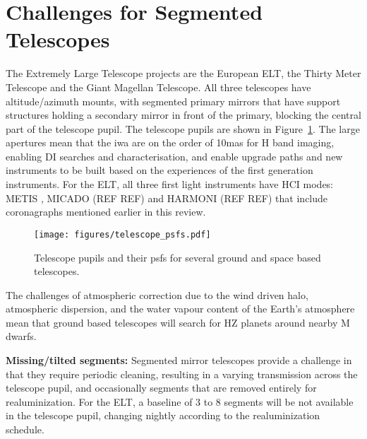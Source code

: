 \documentclass[letterpaper]{ar-1col}
\begin{document}





\section{Challenges for Segmented Telescopes}

The Extremely Large Telescope projects are the European ELT, the Thirty Meter Telescope and the Giant Magellan Telescope.
%
All three telescopes have altitude/azimuth mounts, with segmented primary mirrors that have support structures holding a secondary mirror in front of the primary, blocking the central part of the telescope pupil.
%
The telescope pupils are shown in Figure~\ref{fig:telpsfs}.
%
The large apertures mean that the \ac{iwa} are on the order of 10mas for H band imaging, enabling DI searches and characterisation, and enable upgrade paths and new instruments to be built based on the experiences of the first generation instruments.
%
For the ELT, all three first light instruments have HCI modes: METIS \citep{Brandl21,Kenworthy16,Carlomagno20}, MICADO (REF REF) and HARMONI (REF REF) that include coronagraphs mentioned earlier in this review.
%


\begin{figure}[ht]
  \centering
  \texttt{[image: figures/telescope\_psfs.pdf]}
  \caption{Telescope pupils and their \acp{psf} for several ground and space based telescopes.}
  \label{fig:telpsfs}
\end{figure}

%
The challenges of atmospheric correction due to the wind driven halo, atmospheric dispersion, and the water vapour content of the Earth's atmosphere mean that ground based telescopes will search for HZ planets around nearby M dwarfs.

{\bf Missing/tilted segments:} Segmented mirror telescopes provide a challenge in that they require periodic cleaning, resulting in a varying transmission across the telescope pupil, and occasionally segments that are removed entirely for realuminization.
%
For the ELT, a baseline of 3 to 8 segments will be not available in the telescope pupil, changing nightly according to the realuminization schedule.
\end{document}
